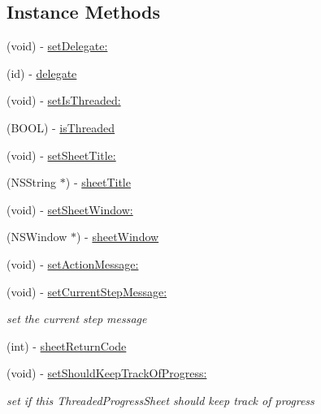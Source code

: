 \subsection*{Instance Methods}
\begin{DoxyCompactItemize}
\item 
(void) -\/ \hyperlink{interface_m_b_threaded_progress_sheet_controller_ad9fbf46d1b242d1b2e6981cf78ee461f}{set\-Delegate\-:}
\item 
(id) -\/ \hyperlink{interface_m_b_threaded_progress_sheet_controller_a6c98e239b6ba279cfc95c64db9de555c}{delegate}
\item 
(void) -\/ \hyperlink{interface_m_b_threaded_progress_sheet_controller_aa3e9f0cb4dd88c710a1dffa37f406d6b}{set\-Is\-Threaded\-:}
\item 
(B\-O\-O\-L) -\/ \hyperlink{interface_m_b_threaded_progress_sheet_controller_a91c549d608ebd5b4c86b41501728f1b9}{is\-Threaded}
\item 
(void) -\/ \hyperlink{interface_m_b_threaded_progress_sheet_controller_a4c8a147a5f86c949017d735c1097a016}{set\-Sheet\-Title\-:}
\item 
(N\-S\-String $\ast$) -\/ \hyperlink{interface_m_b_threaded_progress_sheet_controller_ae21afc63120fc54f21af093b48dbd3a4}{sheet\-Title}
\item 
(void) -\/ \hyperlink{interface_m_b_threaded_progress_sheet_controller_a4b2b2c631c399ce4d6f2ad0d6d3e7a9b}{set\-Sheet\-Window\-:}
\item 
(N\-S\-Window $\ast$) -\/ \hyperlink{interface_m_b_threaded_progress_sheet_controller_a6121cfb864cc3368333af81c46cd940b}{sheet\-Window}
\item 
(void) -\/ \hyperlink{interface_m_b_threaded_progress_sheet_controller_a02c99966a17e71a9a5751e27b5c6d1fa}{set\-Action\-Message\-:}
\item 
(void) -\/ \hyperlink{interface_m_b_threaded_progress_sheet_controller_ab03c0ff1f59a1540d703659e7f8e8296}{set\-Current\-Step\-Message\-:}
\begin{DoxyCompactList}\small\item\em set the current step message \end{DoxyCompactList}\item 
(int) -\/ \hyperlink{interface_m_b_threaded_progress_sheet_controller_ae127de758d9bcd83bc2ddc2d8f4234c6}{sheet\-Return\-Code}
\item 
(void) -\/ \hyperlink{interface_m_b_threaded_progress_sheet_controller_ae62832c1fb87ca87656ad4c8b483ec75}{set\-Should\-Keep\-Track\-Of\-Progress\-:}
\begin{DoxyCompactList}\small\item\em set if this Threaded\-Progress\-Sheet should keep track of progress \end{DoxyCompactList}\item 

\end{DoxyCompactItemize}
